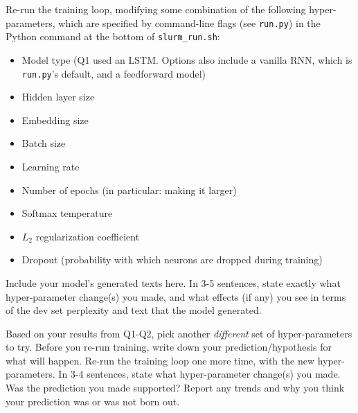 \documentclass[11pt]{article}
\begin{document}
\vspace{2em}
 Re-run the training loop, modifying some combination of the following hyper-parameters, which are specified by command-line flags (see \texttt{run.py}) in the Python command at the bottom of \texttt{slurm\_run.sh}:
\begin{itemize}
  \item Model type (Q1 used an LSTM. Options also include a vanilla RNN, which is \texttt{run.py}'s default, and a feedforward model)
  \item Hidden layer size
  \item Embedding size
  \item Batch size
  \item Learning rate
  \item Number of epochs (in particular: making it larger)
  \item Softmax temperature
  \item $L_2$ regularization coefficient
  \item Dropout (probability with which neurons are dropped during training)
\end{itemize}
Include your model's generated texts here. In 3-5 sentences, state exactly what hyper-parameter change(s) you made, and what effects (if any) you see in terms of the dev set perplexity and text that the model generated.

\vspace{2em}
 Based on your results from Q1-Q2, pick another \textit{different} set of hyper-parameters to try. Before you re-run training, write down your prediction/hypothesis for what will happen. Re-run the training loop one more time, with the new hyper-parameters. In 3-4 sentences, state what hyper-parameter change(s) you made. Was the prediction you made supported? Report any trends and why you think your prediction was or was not born out.
\end{document}
